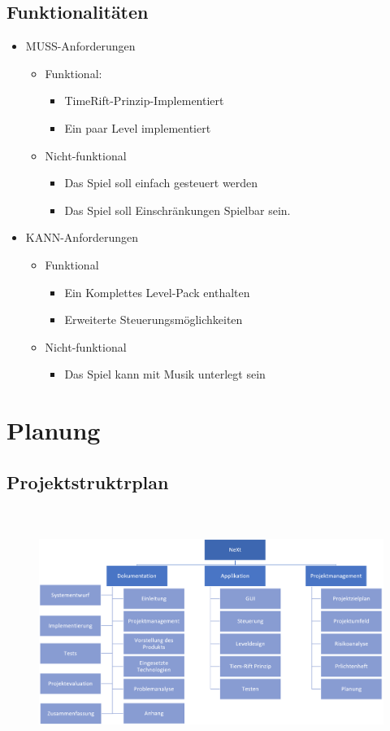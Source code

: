 \subsection{Funktionalitäten}
\begin{itemize}
	\item MUSS-Anforderungen
	\begin{itemize}
		\item Funktional:
		\begin{itemize}
			\item TimeRift-Prinzip-Implementiert
			\item Ein paar Level implementiert
		\end{itemize}
		\item Nicht-funktional
		\begin{itemize}
			\item Das Spiel soll einfach gesteuert werden
			\item Das Spiel soll Einschränkungen Spielbar sein.
		\end{itemize}
	\end{itemize}
	\item KANN-Anforderungen
	\begin{itemize}
		\item Funktional
		\begin{itemize}
			\item Ein Komplettes Level-Pack enthalten
			\item Erweiterte Steuerungsmöglichkeiten 
		\end{itemize}
		\item Nicht-funktional
		\begin{itemize}
			\item Das Spiel kann mit Musik unterlegt sein
		\end{itemize}
	\end{itemize}
\end{itemize}
\section{Planung}
\subsection{Projektstruktrplan}
\begin{figure}[H]
	\centering
	\includegraphics[width=16cm,height=8cm]{images/Projektstrukturplan.png}
	\label{Projektstrukturplan}
\end{figure}

